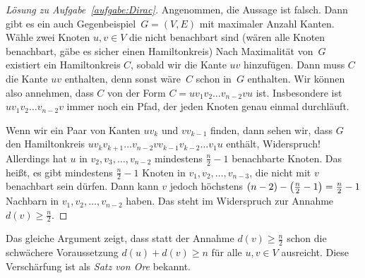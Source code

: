 \begin{proof}[Lösung zu Aufgabe~\ref{aufgabe:Dirac}]
	Angenommen, die Aussage ist falsch. Dann gibt es ein auch Gegenbeispiel~$G=(V,E)$ mit maximaler Anzahl Kanten. Wähle zwei Knoten $u,v\in V$ die nicht benachbart sind (wären alle Knoten benachbart, gäbe es sicher einen Hamiltonkreis) Nach Maximalität von~$G$ existiert ein Hamiltonkreis $C$, sobald wir die Kante $uv$ hinzufügen. Dann muss $C$ die Kante $uv$ enthalten, denn sonst wäre~$C$ schon in~$G$ enthalten. Wir können also annehmen, dass $C$ von der Form $C=uv_1v_2\dotso v_{n-2}vu$ ist. Insbesondere ist $uv_1v_2\dots v_{n-2}v$ immer noch ein Pfad, der jeden Knoten genau einmal durchläuft. 
	\begin{figure}[ht]
		\centering
	\end{figure}
	
	Wenn wir ein Paar von Kanten $uv_k$ und $vv_{k-1}$ finden, dann sehen wir, dass $G$ den Hamiltonkreis $uv_kv_{k+1}\dots v_{n-2}vv_{k-1}v_{k-2}\dots v_1u$ enthält, Widerspruch! Allerdings hat $u$ in $v_2,v_3,\dots,v_{n-2}$ mindestens $\frac{n}{2}-1$ benachbarte Knoten. Das heißt, es gibt mindestens $\frac{n}{2}-1$ Knoten in $v_1,v_2,\dots, v_{n-3}$, die nicht mit $v$ benachbart sein dürfen. Dann kann $v$ jedoch höchstens $(n-2)-\parens[\big]{\frac{n}{2}-1}=\frac{n}{2}-1$ Nachbarn in $v_1,v_2,\dots, v_{n-2}$ haben. Das steht im Widerspruch zur Annahme $d(v)\geqslant \frac n2$.
\end{proof}
Das gleiche Argument zeigt, dass statt der Annahme $d(v)\geqslant \frac n2$ schon die schwächere Voraussetzung $d(u)+d(v)\geqslant n$ für alle $u,v\in V$ ausreicht. Diese Verschärfung ist als \emph{Satz von Ore} bekannt.